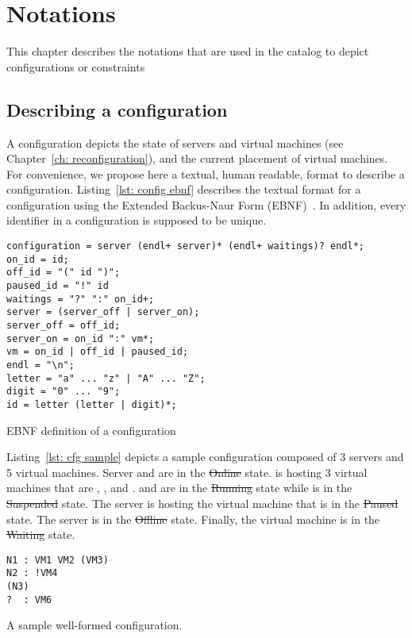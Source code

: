 \chapter{Notations}
\label{ch: annexe}
This chapter describes the notations that are used in the catalog to depict configurations or constraints 

\section{Describing a configuration}
\label{sec: config signature}
A configuration depicts the state of servers and virtual machines (see Chapter~\ref{ch: reconfiguration}), and the current placement of virtual machines. For convenience, we propose here a textual, human readable, format to describe a configuration. Listing~\ref{lst: config ebnf} describes the textual format for a configuration using the Extended Backus-Naur Form (EBNF)~\cite{ebnf}.
%
In addition, every identifier in a configuration is supposed to be unique.


\begin{myListing}
\begin{lstlisting}
configuration = server (endl+ server)* (endl+ waitings)? endl*;
on_id = id;
off_id = "(" id ")";
paused_id = "!" id
waitings = "?" ":" on_id+;
server = (server_off | server_on);
server_off = off_id;
server_on = on_id ":" vm*;
vm = on_id | off_id | paused_id;
endl = "\n";
letter = "a" ... "z" | "A" ... "Z";
digit = "0" ... "9";
id = letter (letter | digit)*;
\end{lstlisting}
\caption{EBNF definition of a configuration}\label{lst: config ebnf}
\end{myListing}


Listing~\ref{lst: cfg sample} depicts a sample configuration composed of 3 servers and 5 virtual machines.
Server  and  are in the \st{Online} state.  is hosting 3 virtual machines that are , , and .  and  are in the \st{Running} state while  is in the \st{Suspended} state.
The server  is hosting the virtual machine  that is in the \st{Paused} state.
The server  is in the \st{Offline} state.
Finally, the virtual machine  is in the \st{Waiting} state.

\begin{myListing}
\begin{lstlisting}
N1 : VM1 VM2 (VM3)
N2 : !VM4
(N3)
?  : VM6
\end{lstlisting}
\caption{A sample well-formed configuration.}\label{lst: cfg sample}
\end{myListing}


